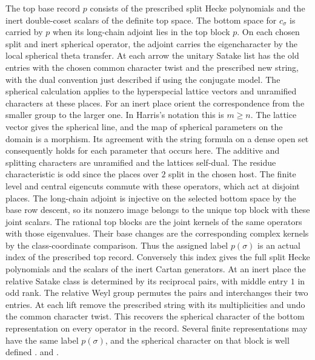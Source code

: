 The top base record \(p\) consists of the prescribed split
Hecke polynomials and the inert double-coset scalars of the
definite top space. The bottom space for \(c_\sigma\) is carried
by \(p\) when its long-chain adjoint lies in the top block
\(p\). On each chosen split and inert spherical operator, the
adjoint carries the eigencharacter by the local spherical theta
transfer. At each arrow the unitary Satake list has the old
entries with the chosen common character twist and the prescribed
new string, with the dual convention just described if using the
conjugate model. The spherical calculation applies to the
hyperspecial lattice vectors and unramified characters at these
places. For an inert place orient the correspondence from the
smaller group to the larger one. In Harris's notation this is
\(m\ge n\). The lattice vector gives the spherical line, and the
map of spherical parameters on the domain is a morphism. Its
agreement with the string formula on a dense open set consequently
holds for each parameter that occurs here. The additive and
splitting characters are unramified and the lattices self-dual.
The residue characteristic is odd since the places over \(2\)
split in the chosen host. The finite level
and central eigencuts commute with these operators, which act at
disjoint places. The long-chain adjoint is injective on the
selected bottom space by the base row descent, so its nonzero
image belongs to the unique top block with these joint scalars.
The rational top blocks are the joint kernels of the same
operators with those eigenvalues. Their base changes are the
corresponding complex kernels by the class-coordinate comparison.
Thus the assigned label \(p(\sigma)\) is an actual index of the
prescribed top record. Conversely this index gives the full split
Hecke polynomials and the scalars of the inert Cartan generators.
At an inert place the relative Satake class is determined by its
reciprocal pairs, with middle entry \(1\) in odd rank. The relative
Weyl group permutes the pairs and interchanges their two entries.
At each lift remove the prescribed string with its multiplicities
and undo the common character twist. This recovers the spherical
character of the bottom representation on every operator in the
record. Several finite representations may have the same label
\(p(\sigma)\), and the spherical character on that block is
well defined \cite{rank-harris-spherical}.
 and
.

